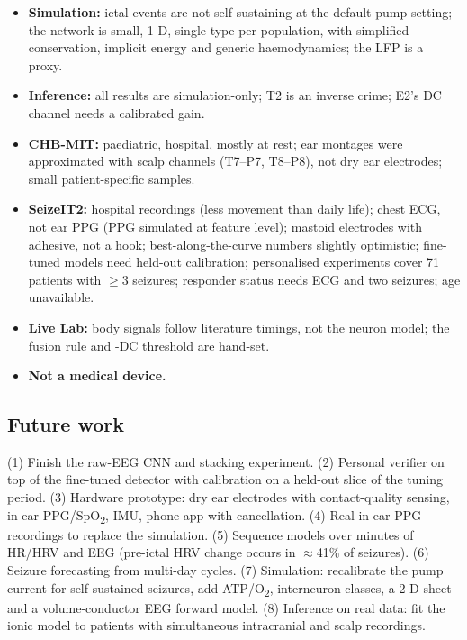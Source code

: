\begin{itemize}
\item \textbf{Simulation:} ictal events are not self-sustaining at the default pump setting; the network is small, 1-D, single-type per population, with simplified conservation, implicit energy and generic haemodynamics; the LFP is a proxy.
\item \textbf{Inference:} all results are simulation-only; T2 is an inverse crime; E2's DC channel needs a calibrated gain.
\item \textbf{CHB-MIT:} paediatric, hospital, mostly at rest; ear montages were approximated with scalp channels (T7--P7, T8--P8), not dry ear electrodes; small patient-specific samples.
\item \textbf{SeizeIT2:} hospital recordings (less movement than daily life); chest ECG, not ear PPG (PPG simulated at feature level); mastoid electrodes with adhesive, not a hook; best-along-the-curve numbers slightly optimistic; fine-tuned models need held-out calibration; personalised experiments cover 71 patients with $\ge$3 seizures; responder status needs ECG and two seizures; age unavailable.
\item \textbf{Live Lab:} body signals follow literature timings, not the neuron model; the fusion rule and \Kp-DC threshold are hand-set.
\item \textbf{Not a medical device.}
\end{itemize}

\subsection{Future work}

(1) Finish the raw-EEG CNN and stacking experiment. (2) Personal verifier on top of the fine-tuned detector with calibration on a held-out slice of the tuning period. (3) Hardware prototype: dry ear electrodes with contact-quality sensing, in-ear PPG/SpO\textsubscript{2}, IMU, phone app with cancellation. (4) Real in-ear PPG recordings to replace the simulation. (5) Sequence models over minutes of HR/HRV and EEG (pre-ictal HRV change occurs in $\approx$41\% of seizures). (6) Seizure forecasting from multi-day cycles. (7) Simulation: recalibrate the pump current for self-sustained seizures, add ATP/O\textsubscript{2}, interneuron classes, a 2-D sheet and a volume-conductor EEG forward model. (8) Inference on real data: fit the ionic model to patients with simultaneous intracranial and scalp recordings.


